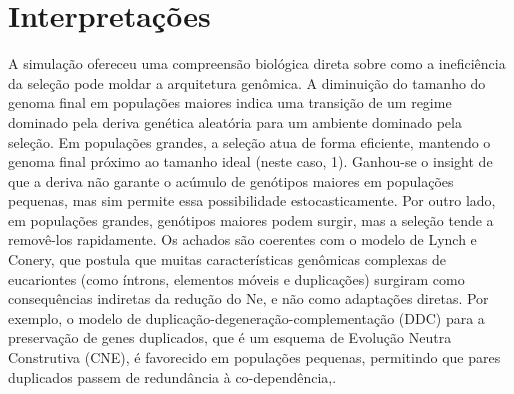\section{Interpretações}

A simulação ofereceu uma compreensão biológica direta sobre como a ineficiência da seleção pode moldar a arquitetura genômica. A diminuição do tamanho do genoma final em populações maiores indica uma transição de um regime dominado pela deriva genética aleatória para um ambiente dominado pela seleção. Em populações grandes, a seleção atua de forma eficiente, mantendo o genoma final próximo ao tamanho ideal (neste caso, 1).
Ganhou-se o insight de que a deriva não garante o acúmulo de genótipos maiores em populações pequenas, mas sim permite essa possibilidade estocasticamente. Por outro lado, em populações grandes, genótipos maiores podem surgir, mas a seleção tende a removê-los rapidamente.
Os achados são coerentes com o modelo de Lynch e Conery, que postula que muitas características genômicas complexas de eucariontes (como íntrons, elementos móveis e duplicações) surgiram como consequências indiretas da redução do Ne, e não como adaptações diretas. Por exemplo, o modelo de duplicação-degeneração-complementação (DDC) para a preservação de genes duplicados, que é um esquema de Evolução Neutra Construtiva (CNE), é favorecido em populações pequenas, permitindo que pares duplicados passem de redundância à co-dependência,.

